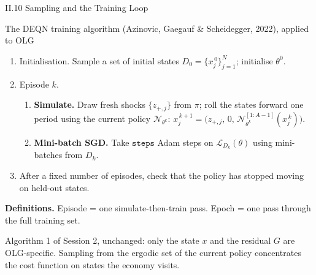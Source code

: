 \documentclass[aspectratio=169,11pt]{beamer}
\newcommand{\emphc}[1]{\textcolor{harvardcrimson}{#1}}
\newcommand{\N}{\mathcal{N}}
\newcommand{\Loss}{\mathcal{L}}
\begin{document}
\begin{frame}{II.10 Sampling and the Training Loop}
\small
\begin{block}{The DEQN training algorithm (Azinovic, Gaegauf \& Scheidegger, 2022), applied to OLG}
\vspace{-2pt}
\begin{enumerate}\itemsep2pt
    \item \emphc{Initialisation.}  Sample a set of initial states $D_0 = \{x_j^{\,0}\}_{j=1}^{N}$; initialise $\theta^0$.
    \item \emphc{Episode $k$.}
    \begin{enumerate}
        \item[(a)] \textbf{Simulate.}  Draw fresh shocks $\{z_{+,j}\}$ from $\pi$; roll the states forward one period using the \emphc{current} policy $\N_{\theta^k}$:
        $x_j^{\,k+1} = \bigl(z_{+,j},\,0,\,\N_{\theta^k}^{[1:A-1]}(x_j^{\,k})\bigr)$.
        \item[(b)] \textbf{Mini-batch SGD.}  Take $\texttt{steps}$ Adam steps on $\Loss_{D_k}(\theta)$ using mini-batches from $D_k$.
    \end{enumerate}
    \item After a fixed number of episodes, check that the policy has stopped moving on held-out states.
\end{enumerate}
\end{block}

\vspace{0.2em}
\textbf{Definitions.}  \emphc{Episode} = one simulate-then-train pass.  \emphc{Epoch} = one pass through the full training set.

\vspace{0.2em}
{\footnotesize Algorithm 1 of Session 2, unchanged: only the state $x$ and the residual $G$ are OLG-specific.  Sampling from the ergodic set of the current policy concentrates the cost function on states the economy visits.}
\end{frame}
\end{document}
